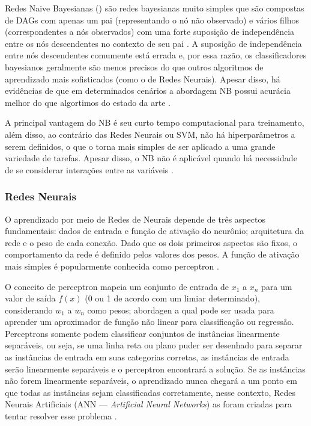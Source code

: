 \documentclass[
	12pt,				%
	oneside,			%
	a4paper,			%
	english,			%
	brazil				%
	]{abntex2ppgsi}
\begin{document}
{Redes Naive Bayesianas () são redes bayesianas muito simples que são compostas de DAGs com apenas um pai (representando o nó não observado) e vários filhos (correspondentes a nós observados) com uma forte suposição de independência entre os nós descendentes no contexto de seu pai \cite{kotsiantis2006machine}.  A suposição de independência entre nós descendentes comumente está errada e, por essa razão, os classificadores bayesianos geralmente são menos precisos do que outros algoritmos de aprendizado mais sofisticados (como o de Redes Neurais). Apesar disso, há evidências de que em determinados cenários a abordagem NB possui acurácia melhor do que algortimos do estado da arte \cite{kotsiantis2006machine}.

A principal vantagem do NB é seu curto tempo computacional para treinamento, além disso, ao contrário das Redes Neurais ou SVM, não há hiperparâmetros a serem definidos, o que o torna mais simples de ser aplicado a uma grande variedade de tarefas. Apesar disso, o NB não é aplicável quando há necessidade de se considerar interações entre as variáveis \cite{kotsiantis2006machine, singh2016review}.

\subsubsection{Redes Neurais}

O aprendizado por meio de Redes de Neurais depende de três aspectos fundamentais: dados de entrada e função de ativação do neurônio; arquitetura da rede e o peso de cada conexão. Dado que os dois primeiros aspectos são fixos, o comportamento da rede é definido pelos valores  dos pesos. A função de ativação mais simples é popularmente conhecida como perceptron \cite{kotsiantis2006machine}.

O conceito de perceptron mapeia um conjunto de entrada de $x_1$ a $x_n$ para um valor de saída $f(x)$ (0 ou 1 de acordo com um limiar determinado), considerando $w_1$ a $w_n$ como pesos; abordagen a qual pode ser usada para aprender um aproximador de função não linear para classificação ou regressão. Perceptrons somente podem classificar conjuntos de instâncias linearmente separáveis, ou seja, se uma linha reta ou plano puder ser desenhado para separar as instâncias de entrada em suas categorias corretas, as instâncias de entrada serão linearmente separáveis e o perceptron encontrará a solução. Se as instâncias não forem linearmente separáveis, o aprendizado nunca chegará a um ponto em que todas as instâncias sejam classificadas corretamente, nesse contexto, Redes Neurais Artificiais (ANN --- \textit{Artificial Neural Networks}) as foram criadas para tentar resolver esse problema \cite{kotsiantis2006machine, singh2016review}. 

}
\end{document}
